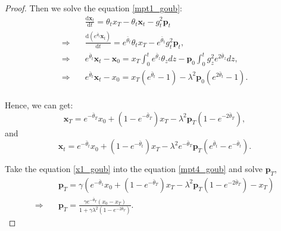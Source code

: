 \begin{proof}
Then we solve the equation \eqref{mpt1_goub}:
\begin{align*}
    &\frac{\mathrm{d} \mathbf{x}_t}{\mathrm{d} t} = \theta_t x_T - \theta_t \mathbf{x}_t - g^2_t \mathbf{p}_{t} \\
    \Rightarrow \quad &\frac{\mathrm{d} (e^{\bar{\theta}_{t}} \mathbf{x}_t)}{\mathrm{d} t} = e^{\bar{\theta}_{t}} \theta_t x_T - e^{\bar{\theta}_{t}} g^2_t \mathbf{p}_{t}, \\
    \Rightarrow \quad &e^{\bar{\theta}_{t}} \mathbf{x}_t - \mathbf{x}_0 = x_T \int_{0}^{t}e^{\bar{\theta}_{z}} \theta_z dz - \mathbf{p}_{0} \int_{0}^{t} g^2_z e^{2\bar{\theta}_{z}} dz,  \\
    \Rightarrow \quad &e^{\bar{\theta}_{t}} \mathbf{x}_t - x_0 = x_T (e^{\bar{\theta}_{t}} - 1) - \lambda^2 \mathbf{p}_{0} (e^{2\bar{\theta}_{t}} - 1). \\
\end{align*}

Hence, we can get:
\begin{equation}\label{x1_goub}
\mathbf{x}_T = e^{-\bar{\theta}_{T}}x_0 + (1 - e^{-\bar{\theta}_{T}}) x_T - \lambda^2 \mathbf{p}_{T} (1 - e^{-2\bar{\theta}_{T}}),
\end{equation}
and
\begin{equation}\label{xt_goub}
\mathbf{x}_t = e^{-\bar{\theta}_{t}}x_0 + (1 - e^{-\bar{\theta}_{t}}) x_T - \lambda^2 e^{-\bar{\theta}_{T}} \mathbf{p}_{T}  (e^{\bar{\theta}_{t}} - e^{-\bar{\theta}_{t}}).
\end{equation}

Take the equation \eqref{x1_goub} into the equation \eqref{mpt4_goub} and solve $\mathbf{p}_{T}$, 
\begin{align*}
&\mathbf{p}_{T} = \gamma \left( e^{-\bar{\theta}_{1}}x_0 + (1 - e^{-\bar{\theta}_{T}}) x_T - \lambda^2 \mathbf{p}_{T} (1 - e^{-2\bar{\theta}_{T}}) - x_{T} \right) \\
\Rightarrow \quad & \mathbf{p}_{T} = \frac{\gamma e^{-\bar{\theta}_{T}} (x_0 - x_T)}{1 + \gamma \lambda^2 (1 - e^{-2\bar{\theta}_{T}})}.
\end{align*}



\end{proof}
